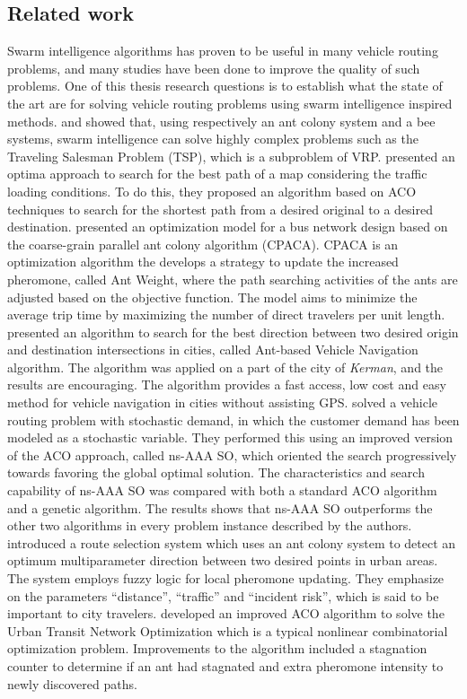\subsection{Related work}


Swarm intelligence algorithms has proven to be useful in many vehicle routing problems, and many studies have been done to improve the quality of such problems. One of this thesis research questions is to establish what the state of the art are for solving vehicle routing problems using swarm intelligence inspired methods. \citet{dorigo97} and \citet{lucic03} showed that, using respectively an ant colony system and a bee systems, swarm intelligence can solve highly complex problems such as the Traveling Salesman Problem (TSP), which is a subproblem of VRP. \citet{hsiao04} presented an optima approach to search for the best path of a map considering the traffic loading conditions. To do this, they proposed an algorithm based on ACO techniques to search for the shortest path from a desired original to a desired destination. \citet{yang07} presented an optimization model for a bus network design based on the coarse-grain parallel ant colony algorithm (CPACA). CPACA is an optimization algorithm the develops a strategy to update the increased pheromone, called Ant Weight, where the path searching activities of the ants are adjusted based on the objective function. The model aims to minimize the average trip time by maximizing the number of direct travelers per unit length. \citet{salehi-nezhad07} presented an algorithm to search for the best direction between two desired origin and destination intersections in cities, called Ant-based Vehicle Navigation algorithm. The algorithm was applied on a part of the city of \textit{Kerman}, and the results are encouraging. The algorithm provides a fast access, low cost and easy method for vehicle navigation in cities without assisting GPS.\citet{tripathi09} solved a vehicle routing problem with stochastic demand, in which the customer demand has been modeled as a stochastic variable. They performed this using an improved version of the ACO approach, called ns-AAA SO, which oriented the search progressively towards favoring the global optimal solution. The characteristics and search capability of ns-AAA SO was compared with both a standard ACO algorithm and a genetic algorithm. The results shows that ns-AAA SO outperforms the other two algorithms in every problem instance described by the authors. \citet{salehinejad10} introduced a route selection system which uses an ant colony system to detect an optimum multiparameter direction between two desired points in urban areas. The system employs fuzzy logic for local pheromone updating. They emphasize on the parameters ``distance'', ``traffic'' and ``incident risk'', which is said to be important to city travelers. \citet{jiang10} developed an improved ACO algorithm to solve the Urban Transit Network Optimization which is a typical nonlinear combinatorial optimization problem. Improvements to the algorithm included a stagnation counter to determine if an ant had stagnated and extra pheromone intensity to newly discovered paths. %


